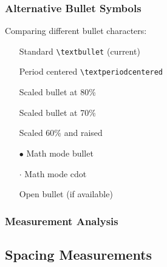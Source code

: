 \documentclass[11pt,letterpaper]{article}
\begin{document}
\subsubsection{Alternative Bullet Symbols}

Comparing different bullet characters:

\begin{itemize}
\item[\textbullet] Standard \texttt{\textbackslash textbullet} (current)
\item[\textperiodcentered] Period centered \texttt{\textbackslash textperiodcentered}
\item[\scalebox{0.8}{\textbullet}] Scaled bullet at 80\%
\item[\scalebox{0.7}{\textbullet}] Scaled bullet at 70\%
\item[\raisebox{0.2ex}{\scalebox{0.6}{\textbullet}}] Scaled 60\% and raised
\item[$\bullet$] Math mode bullet
\item[$\cdot$] Math mode cdot
\item[\textopenbullet] Open bullet (if available)
\end{itemize}

\subsubsection{Measurement Analysis}


\subsection{Spacing Measurements}
\end{document}
